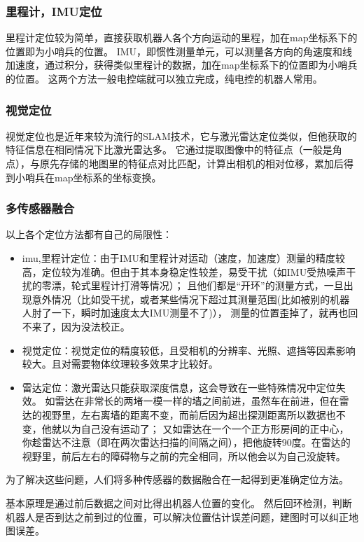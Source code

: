 \subsubsection{ 里程计，IMU定位}
里程计定位较为简单，直接获取机器人各个方向运动的里程，加在map坐标系下的位置即为小哨兵的位置。
IMU，即惯性测量单元，可以测量各方向的角速度和线加速度，通过积分，获得类似里程计的数据，加在map坐标系下的位置即为小哨兵的位置。
这两个方法一般电控端就可以独立完成，纯电控的机器人常用。

\subsubsection{ 视觉定位}
视觉定位也是近年来较为流行的SLAM技术，它与激光雷达定位类似，但他获取的特征信息在相同情况下比激光雷达多。
它通过提取图像中的特征点（一般是角点），与原先存储的地图里的特征点对比匹配，计算出相机的相对位移，累加后得到小哨兵在map坐标系的坐标变换。

\subsubsection{ 多传感器融合}
以上各个定位方法都有自己的局限性：
\begin{itemize}
\item imu,里程计定位：由于IMU和里程计对运动（速度，加速度）测量的精度较高，定位较为准确。但由于其本身稳定性较差，易受干扰（如IMU受热噪声干扰的零漂，轮式里程计打滑等情况）；
        且他们都是“开环”的测量方式，一旦出现意外情况（比如受干扰，或者某些情况下超过其测量范围(比如被别的机器人肘了一下，瞬时加速度太大IMU测量不了)），
        测量的位置歪掉了，就再也回不来了，因为没法校正。
\item 视觉定位：视觉定位的精度较低，且受相机的分辨率、光照、遮挡等因素影响较大。且对需要物体纹理较多效果才比较好。
\item 雷达定位：激光雷达只能获取深度信息，这会导致在一些特殊情况中定位失效。
        如雷达在非常长的两堵一模一样的墙之间前进，虽然车在前进，但在雷达的视野里，左右离墙的距离不变，而前后因为超出探测距离所以数据也不变，他就以为自己没有运动了；
        又如雷达在一个一个正方形房间的正中心，你趁雷达不注意（即在两次雷达扫描的间隔之间），把他旋转90度。在雷达的视野里，前后左右的障碍物与之前的完全相同，所以他会以为自己没旋转。
\end{itemize}
为了解决这些问题，人们将多种传感器的数据融合在一起得到更准确定位方法。

基本原理是通过前后数据之间对比得出机器人位置的变化。
然后回环检测，判断机器人是否到达之前到过的位置，可以解决位置估计误差问题，建图时可以纠正地图误差。

